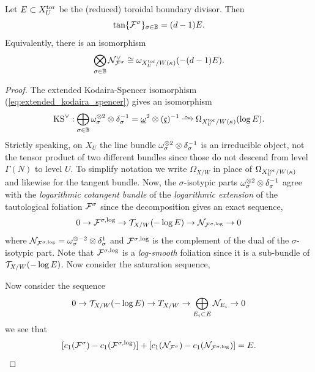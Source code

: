 \documentclass[main.tex]{subfiles}
\begin{document}
{\begin{theorem} \label{thm:tangent_divisor_boundary}
Let $E \subset X_U^{\mathrm{tor}}$ be the (reduced) toroidal boundary divisor. Then 
\[ \tan \{ \mathcal{F}^{\sigma} \}_{\sigma \in \mathbb{B}}  = (d - 1) E. \] 
Equivalently, there is an isomorphism
\[ \bigotimes_{\sigma \in \mathbb{B}} \mathcal{N}_{\mathcal{F}^{\sigma}}^{\vee} \cong \omega_{X_U^{\mathrm{tor}}/W(\kappa)}(-(d-1) E). \]
\end{theorem}

\begin{proof}
The extended Kodaira-Spencer isomorphism (\ref{eq:extended_kodaira_spencer}) gives an isomorphism
\[ \KS^{\vee} : \bigoplus_{\sigma \in \BB} \omega_{\sigma}^{\ot 2} \ot \delta_{\sigma}^{-1} = \ul{\omega}^2 \ot (\ul{\cc})^{-1}  \iso \Omega_{X_U^{\tor}/W(\kappa)}(\log{E}). \]
Strictly speaking, on $X_U$ the line bundle $\omega_{\sigma}^{\otimes 2} \otimes \delta_{\sigma}^{-1}$ is an irreducible object, not the tensor product of two different bundles since those do not descend from level $\Gamma(N)$ to level $U$. To simplify notation we write $\Omega_{X/W}$ in place of $\Omega_{X_U^{\mathrm{tor}}/W(\kappa)}$ and likewise for the tangent bundle. Now, the $\sigma$-isotypic parts $\omega_{\sigma}^{\otimes 2} \otimes \delta_{\sigma}^{-1}$ agree with the \textit{logarithmic cotangent bundle} of the \textit{logarithmic extension} of the tautological foliation $\mathcal{F}^{\sigma}$ since the decomposition gives an exact sequence,
\[ 0 \to \mathcal{F}^{\sigma, \log} \to \mathcal{T}_{X/W}(-\log{E}) \to \mathcal{N}_{\mathcal{F}^{\sigma, \log}} \to 0 \]
where $\mathcal{N}_{\mathcal{F}^{\sigma, \log}} = \omega_{\sigma}^{\otimes -2} \otimes \delta_{\sigma}^{1}$ and $\mathcal{F}^{\sigma, \log}$ is the complement of the dual of the $\sigma$-isotypic part. Note that $\mathcal{F}^{\sigma, \log}$ is a \textit{log-smooth} foliation since it is a sub-bundle of $\mathcal{T}_{X/W}(-\log{E})$. Now consider the saturation sequence,
\begin{center}
\end{center} 
Now consider the sequence
\[ 0 \to \mathcal{T}_{X/W}(-\log{E}) \to T_{X/W} \to \bigoplus_{E_i \subset E} \mathcal{N}_{E_i} \to 0 \]
we see that
\[ [c_1(\mathcal{F}^{\sigma}) - c_1(\mathcal{F}^{\sigma,\log})] + [c_1(\mathcal{N}_{\mathcal{F}^{\sigma}}) - c_1(\mathcal{N}_{\mathcal{F}^{\sigma,\log}})] = E. \]

\end{proof}}
\end{document}

